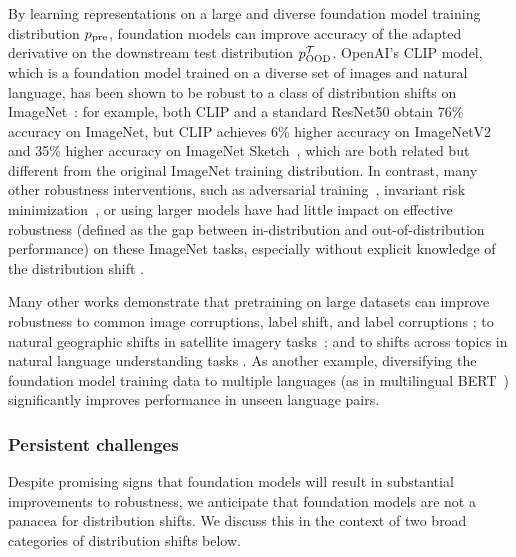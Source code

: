By learning representations on a large and diverse foundation model training distribution $p_{\text{pre}}$, foundation models can improve accuracy of the adapted derivative on the downstream test distribution $p^{\mathcal{T}}_{\text{OOD}}$.
OpenAI's CLIP model, which is a foundation model trained on a diverse set of images and natural language, has been shown to be robust to a class of distribution shifts on ImageNet~\citep{radford2021learning}: 
for example, both CLIP and a standard ResNet50 obtain 76\% accuracy on ImageNet, but CLIP achieves 6\% higher accuracy on ImageNetV2 \citep{recht2019doimagenet} and 35\% higher accuracy on ImageNet Sketch~\citep{radford2021learning}, which are both related but different from the original ImageNet training distribution.
In contrast, many other robustness interventions, such as adversarial training~\citep{madry2018towards}, invariant risk minimization~\citep{arjovsky2019invariant}, or using larger models have had little impact on effective robustness (defined as the gap between in-distribution and out-of-distribution performance) on these ImageNet tasks, especially without explicit knowledge of the distribution shift \citep{taori2020measuring,santurkar2020breeds,radford2021learning,miller2021line}.

Many other works demonstrate that pretraining on large datasets can improve robustness to common image corruptions, label shift, and label corruptions \citep{hendrycks2019pretraining,hendrycks2019selfsupervised};  to natural geographic shifts in satellite imagery tasks~\citep{xie2021innout}; and to shifts across topics in natural language understanding tasks \citep{hendrycks2020pretrained,fisch2019mrqa,yogatama2019learning}.
As another example, diversifying the foundation model training data to multiple languages (as in multilingual BERT~\citep{liu2020multilingual}) significantly improves performance in unseen language pairs.


\subsubsection{Persistent challenges}
\label{sec:robustness-challenges}

Despite promising signs that foundation models will result in substantial improvements to robustness, we anticipate that foundation models are not a panacea for distribution shifts. We discuss this in the context of two broad categories of distribution shifts below.

